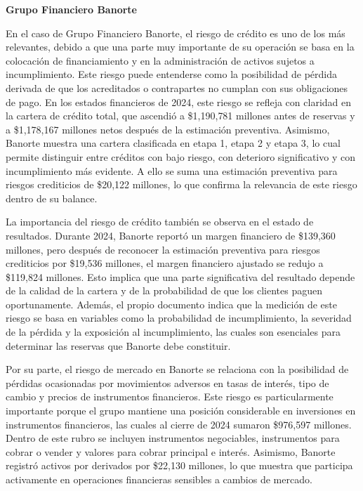 \newpage
\textbf{Grupo Financiero Banorte}

En el caso de Grupo Financiero Banorte, el riesgo de cr\'edito es uno de los m\'as relevantes, debido a que una parte muy importante de su operaci\'on se basa en la colocaci\'on de financiamiento y en la administraci\'on de activos sujetos a incumplimiento. Este riesgo puede entenderse como la posibilidad de p\'erdida derivada de que los acreditados o contrapartes no cumplan con sus obligaciones de pago. En los estados financieros de 2024, este riesgo se refleja con claridad en la cartera de cr\'edito total, que ascendi\'o a \$1{,}190{,}781 millones antes de reservas y a \$1{,}178{,}167 millones netos despu\'es de la estimaci\'on preventiva. Asimismo, Banorte muestra una cartera clasificada en etapa 1, etapa 2 y etapa 3, lo cual permite distinguir entre cr\'editos con bajo riesgo, con deterioro significativo y con incumplimiento m\'as evidente. A ello se suma una estimaci\'on preventiva para riesgos crediticios de \$20{,}122 millones, lo que confirma la relevancia de este riesgo dentro de su balance.

La importancia del riesgo de cr\'edito tambi\'en se observa en el estado de resultados. Durante 2024, Banorte report\'o un margen financiero de \$139{,}360 millones, pero despu\'es de reconocer la estimaci\'on preventiva para riesgos crediticios por \$19{,}536 millones, el margen financiero ajustado se redujo a \$119{,}824 millones. Esto implica que una parte significativa del resultado depende de la calidad de la cartera y de la probabilidad de que los clientes paguen oportunamente. Adem\'as, el propio documento indica que la medici\'on de este riesgo se basa en variables como la probabilidad de incumplimiento, la severidad de la p\'erdida y la exposici\'on al incumplimiento, las cuales son esenciales para determinar las reservas que Banorte debe constituir.

Por su parte, el riesgo de mercado en Banorte se relaciona con la posibilidad de p\'erdidas ocasionadas por movimientos adversos en tasas de inter\'es, tipo de cambio y precios de instrumentos financieros. Este riesgo es particularmente importante porque el grupo mantiene una posici\'on considerable en inversiones en instrumentos financieros, las cuales al cierre de 2024 sumaron \$976{,}597 millones. Dentro de este rubro se incluyen instrumentos negociables, instrumentos para cobrar o vender y valores para cobrar principal e inter\'es. Asimismo, Banorte registr\'o activos por derivados por \$22{,}130 millones, lo que muestra que participa activamente en operaciones financieras sensibles a cambios de mercado.

